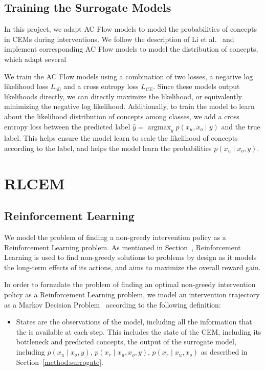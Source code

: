 \documentclass[../main.tex]{subfiles}
\begin{document}
\subsection{Training the Surrogate Models}

In this project, we adapt AC Flow models to model the probabilities of concepts in CEMs during interventions.
We follow the description of Li et al.~\cite{afa} and implement corresponding AC Flow models to model
the distribution of concepts, which adapt several 

We train the AC Flow models using a combination of two losses, a negative
log likelihood loss $L_{\text{nll}}$ and a cross entropy loss $L_{\text{CE}}$. 
Since these models output likelihoods directly,
we can directly maximize the likelihood, or equivalently minimizing the negative log likelihood.
Additionally, to train the model to learn about the likelihood distribution of concepts
among classes, we add a cross entropy loss between the predicted label $\hat{y} = \mathop{\mathrm{argmax}}_y p(x_u, x_o \mid y)$ and the
true label. This helps ensure the model learn to scale the likelihood of concepts according to the 
label, and helps the model learn the probabilities $p(x_u \mid x_o, y)$.

\section{RLCEM}\label{method:rlcem}


\subsection{Reinforcement Learning}

We model the problem of finding a non-greedy intervention policy as a 
Reinforcement Learning problem. As mentioned in Section~\cite{background:rl},
Reinforcement Learning is used to find non-greedy solutions to problems
by design as it models the long-term effects of its actions, and aims to 
maximize the overall reward gain. 

In order to formulate the problem of finding an optimal non-greedy intervention policy
as a Reinforcement Learning problem, we model an intervention
trajectory as a Markov Decision Problem~\cite{rl-mdp} according
to the following definition:
\begin{itemize}
    \item States are the observations of the model, including all the information that the is available
    at each step. This includes the state of the CEM, including its bottleneck and predicted concepts,
    the output of the surrogate model, including $p(x_u \mid x_o, y)$, $p(x_r \mid x_u, x_o, y)$,
    $p(x_r \mid x_u, x_o)$ as described in Section~\ref{method:surrogate}.
\end{itemize}
\end{document}
